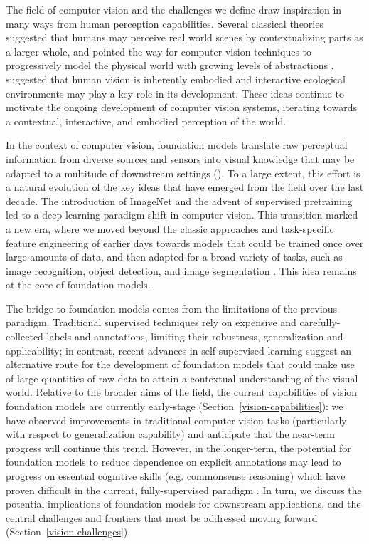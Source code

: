 The field of computer vision and the challenges we define draw inspiration in many ways from human perception capabilities. Several classical theories \citep[e.g. ][]{biederman_perceiving_1972,mcclelland1981interactive,marr1982vision} suggested that humans may perceive real world scenes by contextualizing parts as a larger whole, and pointed the way for computer vision techniques to progressively model the physical world with growing levels of abstractions \cite{lowe1992robust,girshick2014rich}.
\citet{gibson1979ecological} suggested that human vision is inherently embodied and interactive ecological environments may play a key role in its development. These ideas continue to motivate the ongoing development of computer vision systems, iterating towards a contextual, interactive, and embodied perception of the world.

In the context of computer vision, foundation models translate raw perceptual information from diverse sources and sensors into visual knowledge that may be adapted to a multitude of downstream settings (). To a large extent, this effort is a natural evolution of the key ideas that have emerged from the field over the last decade. The introduction of ImageNet \cite{deng2009imagenet} and the advent of supervised pretraining led to a deep learning paradigm shift in computer vision. This transition marked a new era, where we moved beyond the classic approaches and task-specific feature engineering of earlier days \cite{lowe2004distinctive, bay2006surf, rosten2006machine} towards models that could be trained once over large amounts of data, and then adapted for a broad variety of tasks, such as image recognition, object detection, and image segmentation \cite{krizhevsky2012imagenet, szegedy2015going, he2016deep, simonyan2015verydeep}. This idea remains at the core of foundation models.

The bridge to foundation models comes from the limitations of the previous paradigm. Traditional supervised techniques rely on expensive and carefully-collected labels and annotations, limiting their robustness, generalization and applicability; in contrast, recent advances in self-supervised learning \cite{chen2020simclr, He2020MomentumCF} suggest an alternative route for the development of foundation models that could make use of large quantities of raw data to attain a contextual understanding of the visual world. Relative to the broader aims of the field, the current capabilities of vision foundation models are currently early-stage (Section~\ref{vision-capabilities}): we have observed improvements in traditional computer vision tasks (particularly with respect to generalization capability) \cite{radford2021learning,ramesh2021zeroshot} and anticipate that the near-term progress will continue this trend. However, in the longer-term, the potential for foundation models to reduce dependence on explicit annotations may lead to progress on essential cognitive skills (e.g. commonsense reasoning) which have proven difficult in the current, fully-supervised paradigm \cite{zellers2019vcr,martin2021jrdb}. In turn, we discuss the potential implications of foundation models for downstream applications, and the central challenges and frontiers that must be addressed moving forward (Section~\ref{vision-challenges}).


